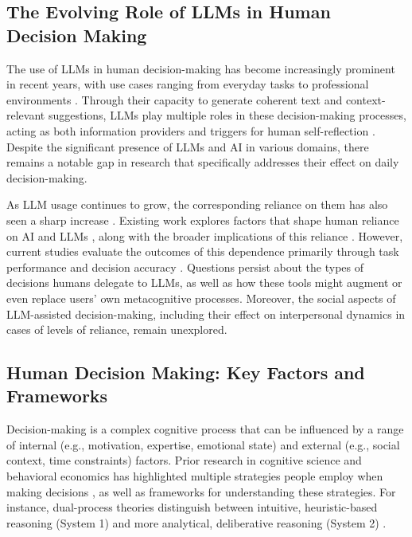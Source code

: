 
\subsection{The Evolving Role of LLMs in Human Decision Making}
The use of LLMs in human decision-making has become increasingly prominent in recent years, with use cases ranging from everyday tasks to professional environments \cite{chkirbene2024applications}. Through their capacity to generate coherent text and context-relevant suggestions, LLMs play multiple roles in these decision-making processes, acting as both information providers and triggers for human self-reflection \cite{kim2022bridging, kmmer2024effects}. Despite the significant presence of LLMs and AI in various domains, there remains a notable gap in research that specifically addresses their effect on daily decision-making.

As LLM usage continues to grow, the corresponding reliance on them has also seen a sharp increase \cite{he2025conversational}. Existing work explores factors that shape human reliance on AI and LLMs \cite{eigner2024determinants}, along with the broader implications of this reliance \cite{kmmer2024effects}. However, current studies evaluate the outcomes of this dependence primarily through task performance and decision accuracy \cite{kim2025fostering}.
Questions persist about the types of decisions humans delegate to LLMs, as well as how these tools might augment or even replace users' own metacognitive processes. Moreover, the social aspects of LLM-assisted decision-making, including their effect on interpersonal dynamics in cases of levels of reliance, remain unexplored.


\subsection{Human Decision Making: Key Factors and Frameworks}
Decision-making is a complex cognitive process that can be influenced by a range of internal (e.g., motivation, expertise, emotional state) and external (e.g., social context, time constraints) factors. Prior research in cognitive science and behavioral economics has highlighted multiple strategies people employ when making decisions \cite{dhami2012cct, offredy2008cct}, as well as frameworks for understanding these strategies. For instance, dual-process theories distinguish between intuitive, heuristic-based reasoning (System 1) and more analytical, deliberative reasoning (System 2) \cite{djulbegovic2012dualmedical, cardoso2020TheAB}. 

